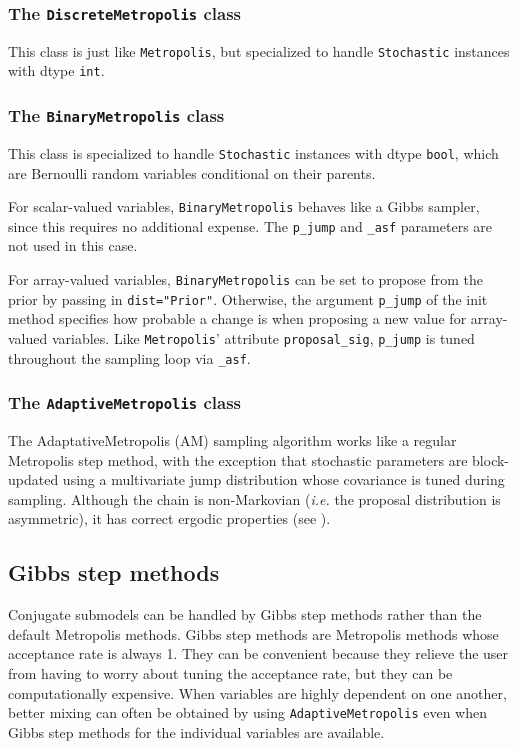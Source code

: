 \subsubsection{The \texttt{DiscreteMetropolis} class}
This class is just like \texttt{Metropolis}, but specialized to handle \texttt{Stochastic} instances with dtype \texttt{int}.

\subsubsection{The \texttt{BinaryMetropolis} class} 
This class is specialized to handle \texttt{Stochastic} instances with dtype \texttt{bool}, which are Bernoulli random variables conditional on their parents. 

For scalar-valued variables, \texttt{BinaryMetropolis} behaves like a Gibbs sampler, since this requires no additional expense. The \texttt{p_jump} and \texttt{_asf} parameters are not used in this case.

For array-valued variables, \texttt{BinaryMetropolis} can be set to propose from the prior by passing in \texttt{dist="Prior"}. Otherwise, the argument \texttt{p_jump} of the init method specifies how probable a change is when proposing a new value for array-valued variables. Like \texttt{Metropolis}' attribute \texttt{proposal_sig}, \texttt{p_jump} is tuned throughout the sampling loop via \texttt{_asf}.

\subsubsection{The \texttt{AdaptiveMetropolis} class} 
The AdaptativeMetropolis (AM) sampling algorithm works like a regular Metropolis step method, with the exception that stochastic parameters are block-updated using a multivariate jump distribution whose covariance is tuned during sampling. Although the chain is non-Markovian (\emph{i.e.} the proposal distribution is asymmetric), it has correct ergodic properties (see \cite{Haario:2001lr}).
 
\hypertarget{gibbs}{}
\subsection*{Gibbs step methods} \label{gibbs}

Conjugate submodels can be handled by Gibbs step methods rather than the default Metropolis methods. Gibbs step methods are Metropolis methods whose acceptance rate is always 1. They can be convenient because they relieve the user from having to worry about tuning the acceptance rate, but they can be computationally expensive. When variables are highly dependent on one another, better mixing can often be obtained by using \texttt{AdaptiveMetropolis} even when Gibbs step methods for the individual variables are available.

